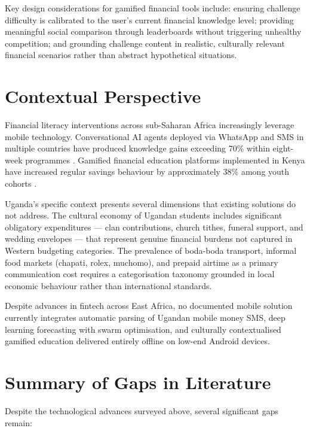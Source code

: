 \documentclass[12pt]{report}
\begin{document}
Key design considerations for gamified financial tools include: ensuring challenge
difficulty is calibrated to the user's current financial knowledge level; providing
meaningful social comparison through leaderboards without triggering unhealthy
competition; and grounding challenge content in realistic, culturally relevant financial
scenarios rather than abstract hypothetical situations.

\section{Contextual Perspective}

Financial literacy interventions across sub-Saharan Africa increasingly leverage mobile
technology. Conversational AI agents deployed via WhatsApp and SMS in multiple
countries have produced knowledge gains exceeding 70\% within eight-week programmes
\citep{Mursi2024}. Gamified financial education platforms implemented in Kenya have
increased regular savings behaviour by approximately 38\% among youth cohorts
\citep{AmanaAndTamunomiegbam2024}.

Uganda's specific context presents several dimensions that existing solutions do not
address. The cultural economy of Ugandan students includes significant obligatory
expenditures --- clan contributions, church tithes, funeral support, and wedding
envelopes --- that represent genuine financial burdens not captured in Western
budgeting categories. The prevalence of boda-boda transport, informal food markets
(chapati, rolex, muchomo), and prepaid airtime as a primary communication cost
requires a categorisation taxonomy grounded in local economic behaviour rather than
international standards.

Despite advances in fintech across East Africa, no documented mobile solution
currently integrates automatic parsing of Ugandan mobile money SMS, deep learning
forecasting with swarm optimisation, and culturally contextualised gamified education
delivered entirely offline on low-end Android devices.

\section{Summary of Gaps in Literature}

Despite the technological advances surveyed above, several significant gaps remain:
\end{document}
